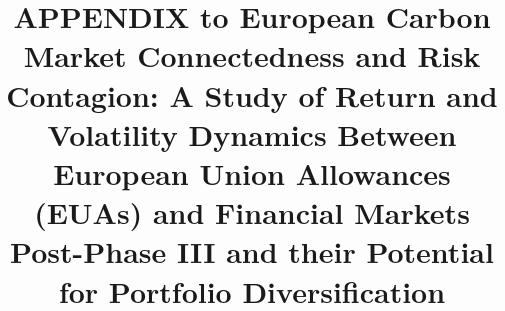 \documentclass[preprint, 3p,
authoryear]{elsarticle} %
\begin{document}
\begin{frontmatter}

  \title{APPENDIX to European Carbon Market Connectedness and Risk
Contagion: A Study of Return and Volatility Dynamics Between European
Union Allowances (EUAs) and Financial Markets Post-Phase III and their
Potential for Portfolio Diversification}
  
  \begin{abstract}
  
  \end{abstract}
  
 \end{frontmatter}

\newpage

\appendix

\begin{landscape}

\end{landscape}
\end{document}
